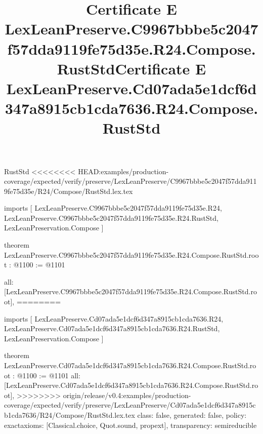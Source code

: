 \begin{lexlean}{RustStd}
<<<<<<<< HEAD:examples/production-coverage/expected/verify/preserve/LexLeanPreserve/C9967bbbe5c2047f57dda9119fe75d35e/R24/Compose/RustStd.lex.tex
\title{Certificate E LexLeanPreserve.C9967bbbe5c2047f57dda9119fe75d35e.R24.Compose.RustStd}
\begin{coremodule}
imports [
  LexLeanPreserve.C9967bbbe5c2047f57dda9119fe75d35e.R24,
  LexLeanPreserve.C9967bbbe5c2047f57dda9119fe75d35e.R24.RustStd,
  LexLeanPreservation.Compose
]

theorem LexLeanPreserve.C9967bbbe5c2047f57dda9119fe75d35e.R24.Compose.RustStd.root : @1100 := @1101 {
  all: [LexLeanPreserve.C9967bbbe5c2047f57dda9119fe75d35e.R24.Compose.RustStd.root],
========
\title{Certificate E LexLeanPreserve.Cd07ada5e1dcf6d347a8915cb1cda7636.R24.Compose.RustStd}
\begin{coremodule}
imports [
  LexLeanPreserve.Cd07ada5e1dcf6d347a8915cb1cda7636.R24,
  LexLeanPreserve.Cd07ada5e1dcf6d347a8915cb1cda7636.R24.RustStd,
  LexLeanPreservation.Compose
]

theorem LexLeanPreserve.Cd07ada5e1dcf6d347a8915cb1cda7636.R24.Compose.RustStd.root : @1100 := @1101 {
  all: [LexLeanPreserve.Cd07ada5e1dcf6d347a8915cb1cda7636.R24.Compose.RustStd.root],
>>>>>>>> origin/release/v0.4:examples/production-coverage/expected/verify/preserve/LexLeanPreserve/Cd07ada5e1dcf6d347a8915cb1cda7636/R24/Compose/RustStd.lex.tex
  class: false,
  generated: false,
  policy: exact{axioms: [Classical.choice, Quot.sound, propext]},
  transparency: semireducible
}


\end{coremodule}}
\end{coremodule}
\end{lexlean}
